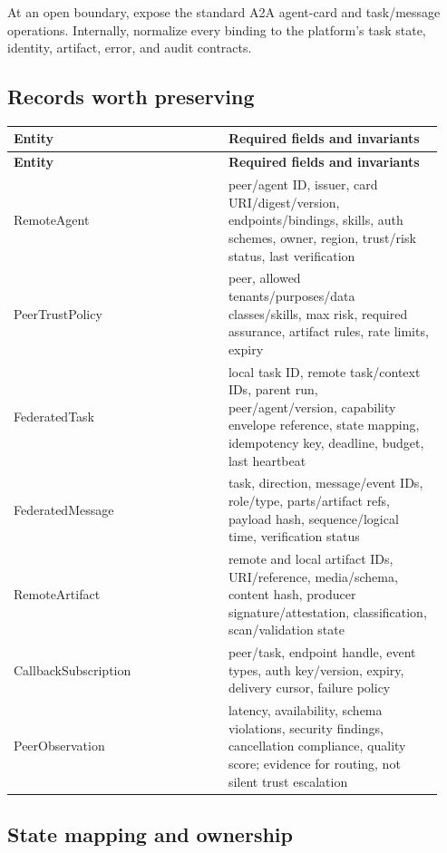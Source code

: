 At an open boundary, expose the standard A2A agent-card and task/message operations. Internally, normalize every binding to the platform’s task state, identity, artifact, error, and audit contracts.\par

\subsection{Records worth preserving}

\BookTableStart
\small
\begin{longtable}{@{}Y{0.4700\linewidth}Y{0.4700\linewidth}@{}}
\color{white}\bfseries \textbf{Entity} & \color{white}\bfseries \textbf{Required fields and invariants} \\
\endfirsthead
{}
\color{white}\bfseries \textbf{Entity} & \color{white}\bfseries \textbf{Required fields and invariants} \\
\endhead
RemoteAgent & peer/agent ID, issuer, card URI/digest/version, endpoints/bindings, skills, auth schemes, owner, region, trust/risk status, last verification \\
PeerTrustPolicy & peer, allowed tenants/purposes/data classes/skills, max risk, required assurance, artifact rules, rate limits, expiry \\
FederatedTask & local task ID, remote task/context IDs, parent run, peer/agent/version, capability envelope reference, state mapping, idempotency key, deadline, budget, last heartbeat \\
FederatedMessage & task, direction, message/event IDs, role/type, parts/artifact refs, payload hash, sequence/logical time, verification status \\
RemoteArtifact & remote and local artifact IDs, URI/reference, media/schema, content hash, producer signature/attestation, classification, scan/validation state \\
CallbackSubscription & peer/task, endpoint handle, event types, auth key/version, expiry, delivery cursor, failure policy \\
PeerObservation & latency, availability, schema violations, security findings, cancellation compliance, quality score; evidence for routing, not silent trust escalation \\
\end{longtable}
\BookTableEnd

\subsection{State mapping and ownership}

